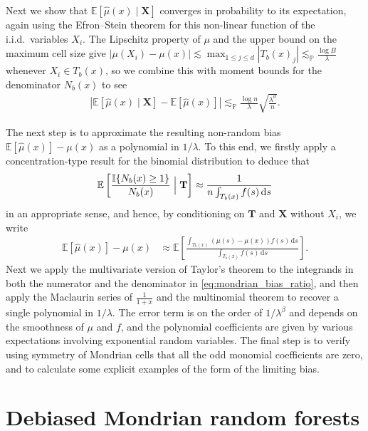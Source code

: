 \documentclass[11pt,lof]{puthesis}
\renewcommand{\P}{\ensuremath{\mathbb{P}}}
\newcommand{\E}{\ensuremath{\mathbb{E}}}
\newcommand{\I}{\ensuremath{\mathbb{I}}}
\newcommand{\bX}{\ensuremath{\mathbf{X}}}
\newcommand{\bT}{\ensuremath{\mathbf{T}}}
\newcommand{\diff}[1]{\,\mathrm{d}#1}
\theoremstyle{break}
\theoremstyle{proof}
\begin{document}
Next we show that $\E \left[ \hat \mu(x) \mid \bX \right]$ converges in
probability to its expectation, again using the Efron--Stein theorem for this
non-linear function of the i.i.d.\ variables $X_i$. The Lipschitz property of
$\mu$ and the upper bound on the maximum cell size give
$|\mu(X_i) - \mu(x)| \lesssim \max_{1 \leq j \leq d} |T_b(x)_j|
\lesssim_\P \frac{\log B}{\lambda}$
whenever $X_i \in T_b(x)$,
so we combine this with moment bounds for the denominator $N_b(x)$ to see
%
\begin{align*}
\left|
\E \left[ \hat \mu(x) \mid \bX \right]
- \E \left[ \hat \mu(x) \right]
\right|
\lesssim_\P
\frac{\log n}{\lambda} \sqrt{\frac{\lambda^d}{n}}.
\end{align*}

The next step is to approximate the resulting non-random bias
$\E \left[ \hat \mu(x) \right] - \mu(x)$ as a polynomial in $1/\lambda$.
To this end, we firstly apply a concentration-type result for the binomial
distribution to deduce that
%
\begin{align*}
\E \left[ \frac{\I\{N_b(x) \geq 1\}}{N_b(x)} \Bigm| \bT \right]
\approx \frac{1}{n \int_{T_b(x)} f(s) \diff s}
\end{align*}
%
in an appropriate sense, and hence,
by conditioning on $\bT$ and $\bX$ without $X_i$, we write
%
\begin{align}
\label{eq:mondrian_bias_ratio}
\E \left[ \hat \mu(x) \right] - \mu(x)
&\approx
\E \left[
\frac{\int_{T_b(x)} (\mu(s) - \mu(x)) f(s) \diff s}
{\int_{T_b(x)} f(s) \diff s}
\right].
\end{align}
%
Next we apply the multivariate version of Taylor's theorem to the integrands in
both the numerator and the denominator in \eqref{eq:mondrian_bias_ratio}, and
then apply
the Maclaurin series of $\frac{1}{1+x}$ and the multinomial theorem to recover
a single polynomial in $1/\lambda$. The error term is on the order of
$1/\lambda^\beta$ and depends on the smoothness of $\mu$ and $f$, and the
polynomial coefficients are given by various expectations involving exponential
random variables. The final step is to verify using symmetry of Mondrian cells
that all the odd monomial coefficients are zero, and to calculate some explicit
examples of the form of the limiting bias.

\section{Debiased Mondrian random forests}%
\label{sec:mondrian_debiased}
\end{document}
